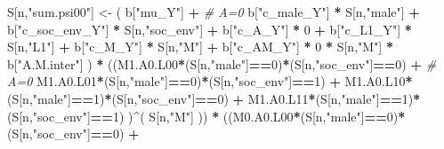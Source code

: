 \documentclass[
]{book}
\newenvironment{Shaded}{\begin{snugshade}}{\end{snugshade}}
\newcommand{\CommentTok}[1]{\textcolor[rgb]{0.56,0.35,0.01}{\textit{#1}}}
\newcommand{\DecValTok}[1]{\textcolor[rgb]{0.00,0.00,0.81}{#1}}
\newcommand{\NormalTok}[1]{#1}
\newcommand{\OtherTok}[1]{\textcolor[rgb]{0.56,0.35,0.01}{#1}}
\newcommand{\SpecialCharTok}[1]{\textcolor[rgb]{0.81,0.36,0.00}{\textbf{#1}}}
\newcommand{\StringTok}[1]{\textcolor[rgb]{0.31,0.60,0.02}{#1}}
\begin{document}
\begin{Shaded}
\begin{Highlighting}[]
\NormalTok{    S[n,}\StringTok{"sum.psi00"}\NormalTok{] }\OtherTok{\textless{}{-}}\NormalTok{  ( b[}\StringTok{"mu\_Y"}\NormalTok{] }\SpecialCharTok{+}                                          \CommentTok{\# A=0}
\NormalTok{                             b[}\StringTok{"c\_male\_Y"}\NormalTok{] }\SpecialCharTok{*}\NormalTok{ S[n,}\StringTok{"male"}\NormalTok{] }\SpecialCharTok{+} 
\NormalTok{                             b[}\StringTok{"c\_soc\_env\_Y"}\NormalTok{] }\SpecialCharTok{*}\NormalTok{ S[n,}\StringTok{"soc\_env"}\NormalTok{] }\SpecialCharTok{+} 
\NormalTok{                             b[}\StringTok{"c\_A\_Y"}\NormalTok{] }\SpecialCharTok{*} \DecValTok{0} \SpecialCharTok{+} 
\NormalTok{                             b[}\StringTok{"c\_L1\_Y"}\NormalTok{] }\SpecialCharTok{*}\NormalTok{ S[n,}\StringTok{"L1"}\NormalTok{] }\SpecialCharTok{+}
\NormalTok{                             b[}\StringTok{"c\_M\_Y"}\NormalTok{] }\SpecialCharTok{*}\NormalTok{ S[n,}\StringTok{"M"}\NormalTok{] }\SpecialCharTok{+}
\NormalTok{                             b[}\StringTok{"c\_AM\_Y"}\NormalTok{] }\SpecialCharTok{*} \DecValTok{0} \SpecialCharTok{*}\NormalTok{ S[n,}\StringTok{"M"}\NormalTok{] }\SpecialCharTok{*}\NormalTok{ b[}\StringTok{"A.M.inter"}\NormalTok{] ) }\SpecialCharTok{*}
\NormalTok{      ((M1.A0.L00}\SpecialCharTok{*}\NormalTok{(S[n,}\StringTok{"male"}\NormalTok{]}\SpecialCharTok{==}\DecValTok{0}\NormalTok{)}\SpecialCharTok{*}\NormalTok{(S[n,}\StringTok{"soc\_env"}\NormalTok{]}\SpecialCharTok{==}\DecValTok{0}\NormalTok{) }\SpecialCharTok{+}                    \CommentTok{\# A\textquotesingle{}=0}
\NormalTok{          M1.A0.L01}\SpecialCharTok{*}\NormalTok{(S[n,}\StringTok{"male"}\NormalTok{]}\SpecialCharTok{==}\DecValTok{0}\NormalTok{)}\SpecialCharTok{*}\NormalTok{(S[n,}\StringTok{"soc\_env"}\NormalTok{]}\SpecialCharTok{==}\DecValTok{1}\NormalTok{) }\SpecialCharTok{+}
\NormalTok{          M1.A0.L10}\SpecialCharTok{*}\NormalTok{(S[n,}\StringTok{"male"}\NormalTok{]}\SpecialCharTok{==}\DecValTok{1}\NormalTok{)}\SpecialCharTok{*}\NormalTok{(S[n,}\StringTok{"soc\_env"}\NormalTok{]}\SpecialCharTok{==}\DecValTok{0}\NormalTok{) }\SpecialCharTok{+} 
\NormalTok{          M1.A0.L11}\SpecialCharTok{*}\NormalTok{(S[n,}\StringTok{"male"}\NormalTok{]}\SpecialCharTok{==}\DecValTok{1}\NormalTok{)}\SpecialCharTok{*}\NormalTok{(S[n,}\StringTok{"soc\_env"}\NormalTok{]}\SpecialCharTok{==}\DecValTok{1}\NormalTok{) )}\SpecialCharTok{\^{}}\NormalTok{( S[n,}\StringTok{"M"}\NormalTok{] )) }\SpecialCharTok{*}
\NormalTok{      ((M0.A0.L00}\SpecialCharTok{*}\NormalTok{(S[n,}\StringTok{"male"}\NormalTok{]}\SpecialCharTok{==}\DecValTok{0}\NormalTok{)}\SpecialCharTok{*}\NormalTok{(S[n,}\StringTok{"soc\_env"}\NormalTok{]}\SpecialCharTok{==}\DecValTok{0}\NormalTok{) }\SpecialCharTok{+}                

\end{Highlighting}
\end{Shaded}
\end{document}
